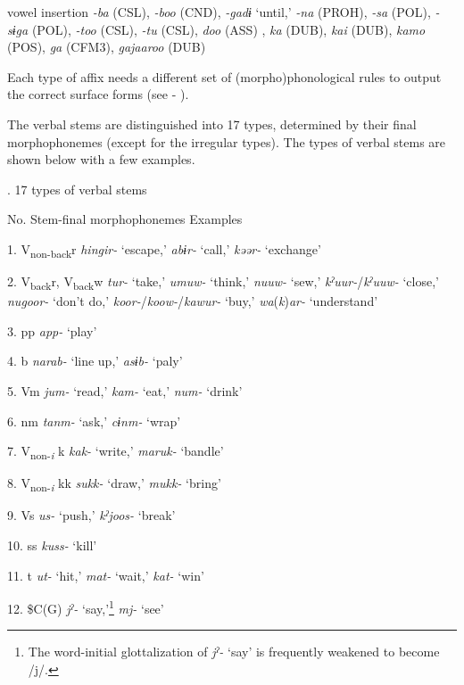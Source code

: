 vowel insertion  \textit{{}-ba} (CSL), \textit{{}-boo} (CND), \textit{{}-gadɨ} ‘until,’ \textit{{}-na} (PROH), \textit{{}-sa} (POL), \textit{{}-sɨga} (POL), \textit{{}-too} (CSL), \textit{{}-tu} (CSL), \textit{doo} (ASS) , \textit{ka} (DUB), \textit{kai} (DUB), \textit{kamo} (POS), \textit{ga} (CFM3), \textit{gajaaroo} (DUB)

Each type of affix needs a different set of (morpho)phonological rules to output the correct surface forms (see  - ).

The verbal stems are distinguished into 17 types, determined by their final morphophonemes (except for the irregular types). The types of verbal stems are shown below with a few examples.

\begin{styleBeschriftung}
\textmd{}\textmd{. 17 types of verbal stems}
\end{styleBeschriftung}

No.  Stem-final morphophonemes  Examples

1.  V\textsubscript{non-back}r  \textit{hingir-} ‘escape,’ \textit{abɨr-} ‘call,’ \textit{kəər-} ‘exchange’

2.  V\textsubscript{back}r, V\textsubscript{back}w  \textit{tur-} ‘take,’ \textit{umuw-} ‘think,’ \textit{nuuw-} ‘sew,’ \textit{kˀuur-}/\textit{kˀuuw-} ‘close,’ \textit{nugoor-} ‘don’t do,’ \textit{koor-}/\textit{koow-}/\textit{kawur-} ‘buy,’ \textit{wa}(\textit{k})\textit{ar-} ‘understand’

3.  pp  \textit{app-} ‘play’

4.  b  \textit{narab-} ‘line up,’ \textit{asɨb-} ‘paly’

5.  Vm  \textit{jum-} ‘read,’ \textit{kam-} ‘eat,’ \textit{num-} ‘drink’

6.  nm  \textit{tanm-} ‘ask,’ \textit{cɨnm-} ‘wrap’

7.  V\textsubscript{non-}\textit{\textsubscript{i} }k  \textit{kak-} ‘write,’ \textit{maruk-} ‘bandle’

8.  V\textsubscript{non-}\textit{\textsubscript{i} }kk  \textit{sukk-} ‘draw,’ \textit{mukk-} ‘bring’

9.  Vs  \textit{us-} ‘push,’ \textit{kˀjoos-} ‘break’

10.  ss  \textit{kuss-} ‘kill’

11.  t  \textit{ut-} ‘hit,’ \textit{mat-} ‘wait,’ \textit{kat-} ‘win’

12.  \$C(G)  \textit{jˀ-} ‘say,’\footnote{The word-initial glottalization of \textit{jˀ-} ‘say’ is frequently weakened to become /j/.} \textit{mj-} ‘see’

